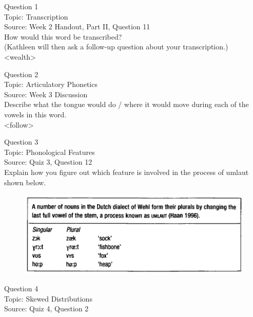 \documentclass[12pt]{article}
\begin{document}
{\large Question 1}\\

Topic: Transcription\\
Source: Week 2 Handout, Part II, Question 11\\

How would this word be transcribed?\\ (Kathleen will then ask a follow-up question about your transcription.)\\

<wealth>


\newpage

{\large Question 2}\\

Topic: Articulatory Phonetics\\
Source: Week 3 Discussion\\

Describe what the tongue would do / where it would move during each of the vowels in this word.\\

<follow>


\newpage

{\large Question 3}\\

Topic: Phonological Features\\
Source: Quiz 3, Question 12\\

Explain how you figure out which feature is involved in the process of umlaut shown below.\\

\begin{figure}[H]
\includegraphics{../images/dutch.png}
\end{figure}

\newpage

{\large Question 4}\\

Topic: Skewed Distributions\\
Source: Quiz 4, Question 2\\
\end{document}
